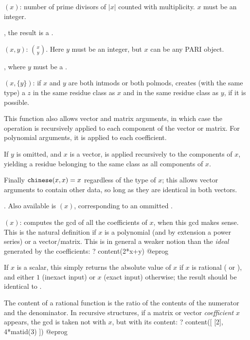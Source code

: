 $(x)$: number of prime divisors of $|x|$ counted with
multiplicity. $x$ must be an integer.

, the result is a .

$(x,y)$:  $\binom{x}{y}$.
Here $y$ must be an integer, but $x$ can be any PARI object.

, where $y$ must be a .

$(x,\{y\})$: if $x$ and $y$ are both intmods or both
polmods, creates (with the same type) a $z$ in the same residue class
as $x$ and in the same residue class as $y$, if it is possible.

This function also allows vector and matrix arguments, in which case the
operation is recursively applied to each component of the vector or matrix.
For polynomial arguments, it is applied to each coefficient.

If $y$ is omitted, and $x$ is a vector,  is applied recursively
to the components of $x$, yielding a residue belonging to the same class as all
components of $x$.

Finally ${\tt chinese}(x,x) = x$ regardless of the type of $x$; this allows
vector arguments to contain other data, so long as they are identical in both
vectors.

. Also available is $(x)$, corresponding to an
ommitted .

$(x)$: computes the gcd of all the coefficients of $x$,
when this gcd makes sense. This is the natural definition
if $x$ is a polynomial (and by extension a power series) or a
vector/matrix. This is in general a weaker notion than the \emph{ideal}
generated by the coefficients:
\bprog
    ? content(2*x+y)
@eprog

If $x$ is a scalar, this simply returns the absolute value of $x$ if $x$ is
rational ( or ), and either $1$ (inexact input) or $x$
(exact input) otherwise; the result should be identical to . 

The content of a rational function is the ratio of the contents of the
numerator and the denominator. In recursive structures, if a
matrix or vector \emph{coefficient} $x$ appears, the gcd is taken 
not with $x$, but with its content:
\bprog
    ? content([ [2], 4*matid(3) ])
@eprog

